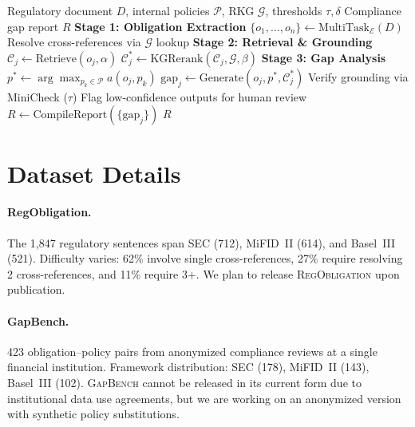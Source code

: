\documentclass[11pt]{article}
\begin{document}
\begin{algorithm}[h]
\caption{ComplianceNLP End-to-End Pipeline}
\label{alg:pipeline}
\small
\begin{algorithmic}[1]
\REQUIRE Regulatory document $D$, internal policies $\mathcal{P}$, RKG $\mathcal{G}$, thresholds $\tau, \delta$
\ENSURE Compliance gap report $R$
\STATE \textbf{Stage 1: Obligation Extraction}
\STATE $\{o_1, \ldots, o_n\} \leftarrow \text{MultiTask}_\mathcal{E}(D)$ 
\STATE Resolve cross-references via $\mathcal{G}$ lookup
\STATE \textbf{Stage 2: Retrieval \& Grounding}
    \STATE $\mathcal{C}_j \leftarrow \text{Retrieve}(o_j, \alpha)$ 
    \STATE $\mathcal{C}_j^* \leftarrow \text{KGRerank}(\mathcal{C}_j, \mathcal{G}, \beta)$
\ENDFOR
\STATE \textbf{Stage 3: Gap Analysis}
    \STATE $p^* \leftarrow \arg\max_{p_k \in \mathcal{P}} a(o_j, p_k)$
        \STATE $\text{gap}_j \leftarrow \text{Generate}(o_j, p^*, \mathcal{C}_j^*)$
        \STATE Verify grounding via MiniCheck ($\tau$)
        \STATE Flag low-confidence outputs for human review
    \ENDIF
\ENDFOR
\STATE $R \leftarrow \text{CompileReport}(\{\text{gap}_j\})$
\RETURN $R$
\end{algorithmic}
\end{algorithm}


\section{Dataset Details}
\label{app:datasets}

\paragraph{RegObligation.} The 1{,}847 regulatory sentences span SEC (712), MiFID~II (614), and Basel~III (521). Difficulty varies: 62\% involve single cross-references, 27\% require resolving 2 cross-references, and 11\% require 3+. We plan to release \textsc{RegObligation} upon publication.

\paragraph{GapBench.} 423 obligation--policy pairs from anonymized compliance reviews at a single financial institution. Framework distribution: SEC (178), MiFID~II (143), Basel~III (102). \textsc{GapBench} cannot be released in its current form due to institutional data use agreements, but we are working on an anonymized version with synthetic policy substitutions.
\end{document}
